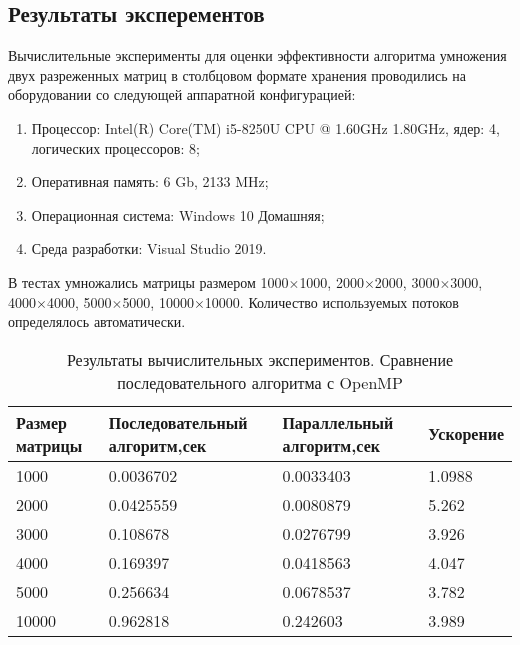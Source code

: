 \documentclass{report}
\begin{document}
\begin{center}
\section*{Результаты эксперементов}
\end{center}
\par Вычислительные эксперименты для оценки эффективности алгоритма умножения двух разреженных матриц в столбцовом формате хранения проводились на оборудовании со следующей аппаратной конфигурацией:
\begin{enumerate}
\item Процессор: Intel(R) Core(TM) i5-8250U CPU @ 1.60GHz 1.80GHz, ядер: 4, логических процессоров: 8;
\item Оперативная память: 6 Gb, 2133 MHz;
\item Операционная система: Windows 10 Домашняя;
\item Среда разработки: Visual Studio 2019.
\end{enumerate}
В тестах умножались матрицы размером 1000$\times$1000, 2000$\times$2000, 3000$\times$3000, 4000$\times$4000, 5000$\times$5000, 10000$\times$10000. Количество используемых потоков определялось автоматически.
\begin{table}[!h]
\caption{Результаты вычислительных экспериментов. Сравнение последовательного алгоритма с OpenMP}
\centering
\begin{tabular}{|p{4cm}|p{4cm}|p{4cm}|p{3cm}|}
\hline
Размер матрицы & Последовательный алгоритм,сек & Параллельный алгоритм,сек & Ускорение  \\\hline
1000 & 0.0036702 & 0.0033403 & 1.0988  \\\hline
2000  & 0.0425559 & 0.0080879 & 5.262  \\\hline
3000  & 0.108678 & 0.0276799 & 3.926  \\\hline
4000  & 0.169397 & 0.0418563 & 4.047  \\\hline
5000  & 0.256634 & 0.0678537 & 3.782  \\\hline
10000 & 0.962818 & 0.242603 & 3.989  \\
\hline
\end{tabular}
\end{table}
\end{document}
